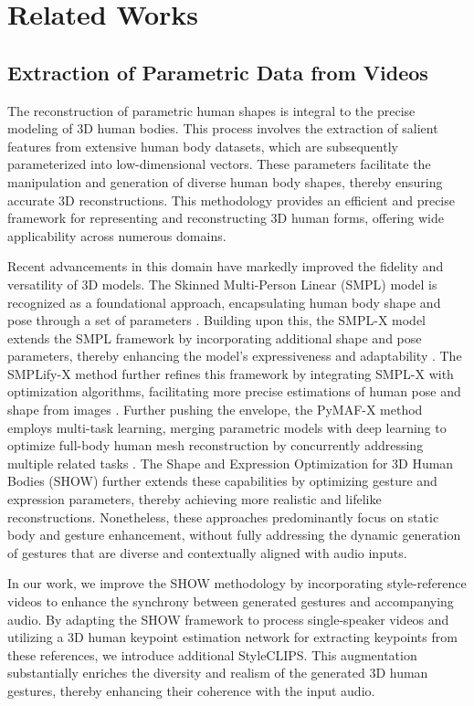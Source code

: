 \section{Related Works}
\subsection{Extraction of Parametric Data from Videos}
The reconstruction of parametric human shapes is integral to the precise modeling of 3D human bodies. This process involves the extraction of salient features from extensive human body datasets, which are subsequently parameterized into low-dimensional vectors. These parameters facilitate the manipulation and generation of diverse human body shapes, thereby ensuring accurate 3D reconstructions. This methodology provides an efficient and precise framework for representing and reconstructing 3D human forms, offering wide applicability across numerous domains.

Recent advancements in this domain have markedly improved the fidelity and versatility of 3D models. The Skinned Multi-Person Linear (SMPL) model is recognized as a foundational approach, encapsulating human body shape and pose through a set of parameters \cite{42}. Building upon this, the SMPL-X model extends the SMPL framework by incorporating additional shape and pose parameters, thereby enhancing the model's expressiveness and adaptability \cite{43}. The SMPLify-X method further refines this framework by integrating SMPL-X with optimization algorithms, facilitating more precise estimations of human pose and shape from images \cite{43}. Further pushing the envelope, the PyMAF-X method employs multi-task learning, merging parametric models with deep learning to optimize full-body human mesh reconstruction by concurrently addressing multiple related tasks \cite{44}. The Shape and Expression Optimization for 3D Human Bodies (SHOW) \cite{11} further extends these capabilities by optimizing gesture and expression parameters, thereby achieving more realistic and lifelike reconstructions. Nonetheless, these approaches predominantly focus on static body and gesture enhancement, without fully addressing the dynamic generation of gestures that are diverse and contextually aligned with audio inputs.

In our work, we improve the SHOW methodology by incorporating style-reference videos to enhance the synchrony between generated gestures and accompanying audio. By adapting the SHOW framework to process single-speaker videos and utilizing a 3D human keypoint estimation network for extracting keypoints from these references, we introduce additional StyleCLIPS. This augmentation substantially enriches the diversity and realism of the generated 3D human gestures, thereby enhancing their coherence with the input audio.

